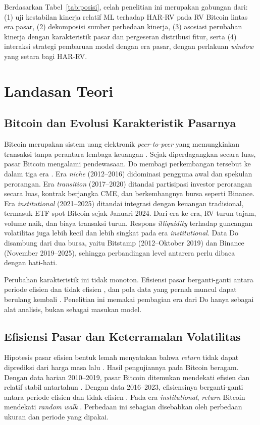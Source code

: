 Berdasarkan Tabel~\ref{tab:posisi}, celah penelitian ini merupakan gabungan
dari: (1) uji kestabilan kinerja relatif ML terhadap HAR-RV pada RV Bitcoin
lintas era pasar, (2) dekomposisi sumber perbedaan kinerja, (3) asosiasi
perubahan kinerja dengan karakteristik pasar dan pergeseran distribusi fitur,
serta (4) interaksi strategi pembaruan model dengan era pasar, dengan
perlakuan \textit{window} yang setara bagi HAR-RV.

\section{Landasan Teori}

\subsection{Bitcoin dan Evolusi Karakteristik Pasarnya}
Bitcoin merupakan sistem uang elektronik \textit{peer-to-peer} yang
memungkinkan transaksi tanpa perantara lembaga keuangan \cite{nakamoto2008}.
Sejak diperdagangkan secara luas, pasar Bitcoin mengalami pendewasaan. Do
membagi perkembangan tersebut ke dalam tiga era \cite{do2026}. Era
\textit{niche} (2012--2016) didominasi pengguna awal dan spekulan perorangan.
Era \textit{transition} (2017--2020) ditandai partisipasi investor perorangan
secara luas, kontrak berjangka CME, dan berkembangnya bursa seperti Binance.
Era \textit{institutional} (2021--2025) ditandai integrasi dengan keuangan
tradisional, termasuk ETF spot Bitcoin sejak Januari 2024. Dari era ke era,
RV turun tajam, volume naik, dan biaya transaksi turun. Respons
\textit{illiquidity} terhadap guncangan volatilitas juga lebih kecil dan lebih
singkat pada era \textit{institutional}. Data Do disambung dari dua bursa,
yaitu Bitstamp (2012--Oktober 2019) dan Binance (November 2019--2025),
sehingga perbandingan level antarera perlu dibaca dengan hati-hati.

Perubahan karakteristik ini tidak monoton. Efisiensi pasar berganti-ganti
antara periode efisien dan tidak efisien \cite{mokni2024}, dan pola data yang
pernah muncul dapat berulang kembali \cite{suarez2023}. Penelitian ini memakai
pembagian era dari Do hanya sebagai alat analisis, bukan sebagai masukan
model.

\subsection{Efisiensi Pasar dan Keterramalan Volatilitas}
Hipotesis pasar efisien bentuk lemah menyatakan bahwa \textit{return} tidak
dapat diprediksi dari harga masa lalu \cite{yi2023}. Hasil pengujiannya pada
Bitcoin beragam. Dengan data harian 2010--2019, pasar Bitcoin ditemukan
mendekati efisien dan relatif stabil antartahun \cite{yi2023}. Dengan data
2016--2023, efisiensinya berganti-ganti antara periode efisien dan tidak
efisien \cite{mokni2024}. Pada era \textit{institutional}, \textit{return}
Bitcoin mendekati \textit{random walk} \cite{do2026}. Perbedaan ini sebagian
disebabkan oleh perbedaan ukuran dan periode yang dipakai.

